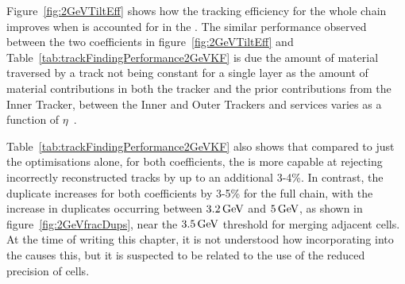 Figure~\ref{fig:2GeVTiltEff} shows how the tracking efficiency for the whole chain improves when \MS is accounted for in the \KF.
The similar performance observed between the two coefficients in figure~\ref{fig:2GeVTiltEff} and Table~\ref{tab:trackFindingPerformance2GeVKF} is due the amount of material traversed by a track not being constant for a single layer as the amount of material contributions in both the tracker and the prior contributions from the Inner Tracker, between the Inner and Outer Trackers and services varies as a function of $\eta$~\cite{P2TrackerTDR}.

Table~\ref{tab:trackFindingPerformance2GeVKF} also shows that compared to just the \HT optimisations alone, for both \MS coefficients, the \KF is more capable at rejecting incorrectly reconstructed tracks by up to an additional 3-4\%.
In contrast, the duplicate increases for both coefficients by 3-5\% for the full chain, with the increase in duplicates occurring between $3.2\,\text{Ge\hspace{-.08em}V}$ and $5\,\text{Ge\hspace{-.08em}V}$, as shown in figure~\ref{fig:2GeVfracDups}, near the $3.5\,\text{Ge\hspace{-.08em}V}$ threshold for merging adjacent \HT cells.
At the time of writing this chapter, it is not understood how incorporating \MS into the \KF causes this, but it is suspected to be related to the use of the reduced precision of \HT cells.

\begin{table}[htbp]
\label{tab:trackFindingPerformance2GeVKF}
\centering
\end{table}

